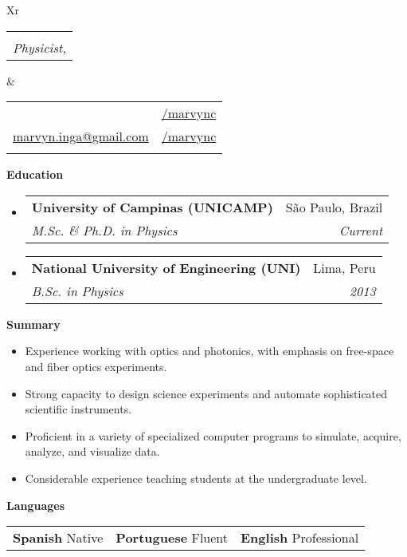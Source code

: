 \documentclass[letterpaper, 12pt]{article}[leftmargin=*]
\makeatletter
\def \fullname {Marvyn Inga}
\def \subtitle {Physicist, \faMale}
\def \linkedinicon {\faLinkedin}
\def \linkedinlink {https://www.linkedin.com/in/marvync/}
\def \linkedintext {/marvync}
\def \phoneicon {\faPhone}
\def \phonetext {+55-21-975106507}
\def \emailicon {\faEnvelope}
\def \emaillink {mailto:marvyn.inga@gmail.com}
\def \emailtext {marvyn.inga@gmail.com}
\def \githubicon {\faGithub}
\def \githublink {https://github.com/marvync}
\def \githubtext {/marvync}
\def \headertype {\doublecol} %
\def \linkedin {\linkedinicon \hspace{3pt}\href{\linkedinlink}{\linkedintext}}
\def \phone {\phoneicon \hspace{3pt}{ \phonetext}}
\def \email {\emailicon \hspace{3pt}\href{\emaillink}{\emailtext}}
\def \github {\githubicon \hspace{3pt}\href{\githublink}{\githubtext}}
\renewcommand{\section}[2]{
  \colorbox{secondary}{\color{white}\raggedbottom\normalsize\textbf{{#1}{\hspace{7pt}#2}}}
}
\newcommand{\resumeEntryStart}{\begin{itemize}[leftmargin=2.5mm]\itemsep8pt}
\newcommand{\resumeEntryEnd}{\end{itemize}}
\newcommand{\resumeItemListStart}{\begin{itemize}[leftmargin=4.5mm]\itemsep-3pt}
\newcommand{\resumeItemListEnd}{\end{itemize}}
\newcommand{\resumeItem}[1]{
  \item\small{
    {#1}
  }
}
\newcommand{\resumeEntryTSDL}[4]{
  \item[]
    \begin{tabularx}{0.97\textwidth}{X@{\hspace{60pt}}r}
      \textbf{\color{primary}#1} & {\firabook\color{accent}\small#2} \\
      \vspace{-0.3cm}
      \textit{\color{accent}\small#3} & \textit{\color{accent}\small#4} \\
    \end{tabularx}\vspace{-0.1cm}
}
\newcommand{\resumeEntryS}[2]{
  \item[]\small{
    \textbf{\color{primary}#1 }{ #2 }
  }
}
\newcommand{\triplecol}[3]{
	\vspace{-0.3cm}
	\begin{tabularx}{\textwidth}{XXX}
	{\small#1} & {\small#2} & {\small#3}
	\end{tabularx}
}
\newcommand{\doublecol}[6]{
  \begin{tabularx}{\textwidth}{Xr}
    {
      \begin{tabular}[c]{l}
        \fontsize{35}{45}\selectfont{\color{primary}{{\textbf{\fullname}}}} \\
        {\textit{\subtitle}} %
      \end{tabular}
    } & {
      \begin{tabular}[c]{l@{\hspace{1.5em}}l}
        {\small#4} & {\small#1} \\
        {\small#5} & {\small#2} \\
        {\small#6} & {\small#3}
      \end{tabular}
    }
  \end{tabularx}
\vspace{0.3cm}
}
\newcommand{\singlecol}[6]{
  \begin{tabularx}{\textwidth}{Xr}
    {
      \begin{tabular}[b]{l}
        \fontsize{35}{45}\selectfont{\color{primary}{{\textbf{\fullname}}}} \\
        {\textit{\subtitle}} %
      \end{tabular}
    } & {
      \begin{tabular}[c]{l}
        {\small#1} \\
        {\small#2} \\
        {\small#3} \\
        {\small#4} \\
        {\small#5} \\
        {\small#6}
      \end{tabular}
    }
  \end{tabularx}
}
\makeatother
\begin{document}


\headertype{\linkedin}{\github}{}{\phone}{\email}{} %

\section{\faGraduationCap}{Education}

\resumeEntryStart
	\small
	\resumeEntryTSDL
    {University of Campinas (UNICAMP)}{São Paulo, Brazil}
	{M.Sc. \& Ph.D. in Physics}{Current}

	\resumeEntryTSDL
	{National University of Engineering (UNI)}{Lima, Peru}
	{B.Sc. in Physics}{2013}
\resumeEntryEnd


\section{\faFolderOpen}{Summary}
\resumeItemListStart
\resumeItem {Experience working with optics and photonics, with emphasis on free-space and fiber optics experiments.}
\resumeItem {Strong capacity to design science experiments and automate sophisticated scientific instruments.}
\resumeItem {Proficient in a variety of specialized computer programs to simulate, acquire, analyze, and visualize data.}
\resumeItem {Considerable experience teaching students at the undergraduate level.}
\resumeItemListEnd

\section{\faComment}{Languages}
\resumeEntryStart
	\small
	\triplecol{\resumeEntryS{Spanish}{Native}}{\resumeEntryS{Portuguese}{Fluent}}{\resumeEntryS{English} {Professional}}
\resumeEntryEnd

\end{document}
